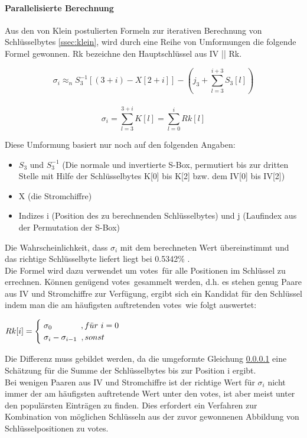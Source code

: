 \documentclass[10pt,a4paper]{article}
\begin{document}
\paragraph{Parallelisierte Berechnung}\label{ssec:p2}
Aus den von Klein postulierten Formeln zur iterativen Berechnung von Schlüsselbytes \ref{ssec:klein}, wird durch eine Reihe von Umformungen \cite[Kapitel 4, Formeln (3)-(5)]{TWP07} die folgende Formel gewonnen. Rk bezeichne den Hauptschlüssel aus IV || Rk.
\begin{center}
\[\sigma_i \approx_n S_3^{-1} [(3 + i) - X[2 + i]] - \left(j_3 + \sum_{l=3}^{i+3} S_3[l]\right)\]
\\\vspace{0.2em}
\[\sigma_i = \sum_{l=3}^{3+i} K[l] = \sum_{l=0}^{i} Rk[l]\]
\end{center}
\vspace{1em}
Diese Umformung basiert nur noch auf den folgenden Angaben:\\
\begin{itemize}
\item $S_3$ und $S_3^{-1}$ (Die normale und invertierte S-Box, permutiert bis zur dritten Stelle mit Hilfe der Schlüsselbytes K[0] bis K[2] bzw. dem IV[0] bis IV[2])
\item X (die Stromchiffre)
\item Indizes i (Position des zu berechnenden Schlüsselbytes) und j (Laufindex aus der Permutation der S-Box)
\end{itemize}
\vspace{0.5em}
Die Wahrscheinlichkeit, dass $\sigma_i$ mit dem berechneten Wert übereinstimmt und das richtige Schlüsselbyte liefert liegt bei 0.5342\% \cite[Kapitel 4, Formel (6)]{TWP07}.\\
Die Formel wird dazu verwendet um \glqq votes\grqq\ für alle Positionen im Schlüssel zu errechnen. Können genügend \glqq votes\grqq\ gesammelt werden, d.h. es stehen genug Paare aus IV und Stromchiffre zur Verfügung, ergibt sich ein Kandidat für den Schlüssel indem man die am häufigsten auftretenden \glqq votes\grqq\ wie folgt auswertet:
\begin{center}
$Rk[i] = \begin{cases}\hspace{0.3em} \sigma_0 \hspace{3.5em}, f\ddot{u}r\ i=0 \\ \hspace{0.3em}\sigma_i - \sigma_{i-1}\hspace{0.5em}, sonst \\\end{cases}$
\end{center}
Die Differenz muss gebildet werden, da die umgeformte Gleichung \ref{ssec:p2} eine Schätzung für die Summe der Schlüsselbytes bis zur Position i ergibt.\\
Bei wenigen Paaren aus IV und Stromchiffre ist der richtige Wert für $\sigma_i$ nicht immer der am häufigsten auftretende Wert unter den \glqq votes\grqq , ist aber meist unter den populärsten Einträgen zu finden. Dies erfordert ein Verfahren zur Kombination von möglichen Schlüsseln aus der zuvor gewonnenen Abbildung von Schlüsselpositionen zu \glqq votes\grqq .
\end{document}

